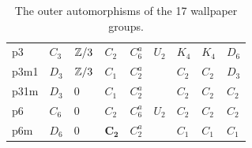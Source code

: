 \begin{table}[!htbp]
\begin{tabular}{lllllllll}
\midrule
p3   & $C_3$     & ${\mathbb Z}/3$    & $C_2$ &  $C^a_6$ & $U_2$ &  $K_4$ & $K_4$ &  $D_6$\\
p3m1 & $D_3$    & ${\mathbb Z}/3$   & $C_1$ & $C^a_2$ &   & $C_2$ &  $C_2$ &  $D_3$   \\
p31m & $D_3$     & $0$    & $C_1$ & $C^a_2$  &   & $C_2$ &  $C_2$ &  $C_2$  \\
p6   &  $C_6$     & $0$       & $C_2$ &  $C^a_6$ & $U_2$       & $C_2$ &  $C_2$ &  $C_2$  \\
p6m  & $D_6$    & $0$   & $\boldsymbol{C_2}$ & $C^a_2$ &   &  $C_1$ &  $C_1$ &  $C_1$   \\
\bottomrule
\end{tabular}
\caption{The outer automorphisms of the 17 wallpaper groups.}
\label{table:wallpaper2}
\end{table}

